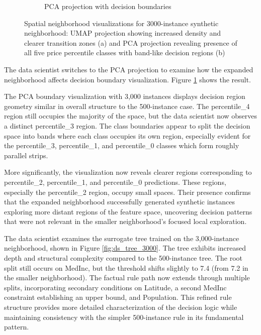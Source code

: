 \begin{figure}[ht]
\begin{subfigure}[c]{0.48\textwidth}
\caption{PCA projection with decision boundaries}
\label{fig:ds_scatter_pca_3000}
\end{subfigure}
\caption{Spatial neighborhood visualizations for 3000-instance synthetic neighborhood: UMAP projection showing increased density and clearer transition zones (a) and PCA projection revealing presence of all five price percentile classes with band-like decision regions (b)}
\label{fig:scatter_3000_comparison}
\end{figure}

The data scientist switches to the PCA projection to examine how the expanded neighborhood affects decision boundary visualization. Figure \ref{fig:ds_scatter_pca_3000} shows the result.

The PCA boundary visualization with 3,000 instances displays decision region geometry similar in overall structure to the 500-instance case. The percentile\_4 region still occupies the majority of the space, but the data scientist now observes a distinct percentile\_3 region. The class boundaries appear to split the decision space into bands where each class occupies its own region, especially evident for the percentile\_3, percentile\_1, and percentile\_0 classes which form roughly parallel strips.

More significantly, the visualization now reveals clearer regions corresponding to percentile\_2, percentile\_1, and percentile\_0 predictions. These regions, especially the percentile\_2 region, occupy small spaces. Their presence confirms that the expanded neighborhood successfully generated synthetic instances exploring more distant regions of the feature space, uncovering decision patterns that were not relevant in the smaller neighborhood's focused local exploration.

The data scientist examines the surrogate tree trained on the 3,000-instance neighborhood, shown in Figure \ref{fig:ds_tree_3000}. The tree exhibits increased depth and structural complexity compared to the 500-instance tree. The root split still occurs on MedInc, but the threshold shifts slightly to 7.4 (from 7.2 in the smaller neighborhood). The factual rule path now extends through multiple splits, incorporating secondary conditions on Latitude, a second MedInc constraint establishing an upper bound, and Population. This refined rule structure provides more detailed characterization of the decision logic while maintaining consistency with the simpler 500-instance rule in its fundamental pattern.

